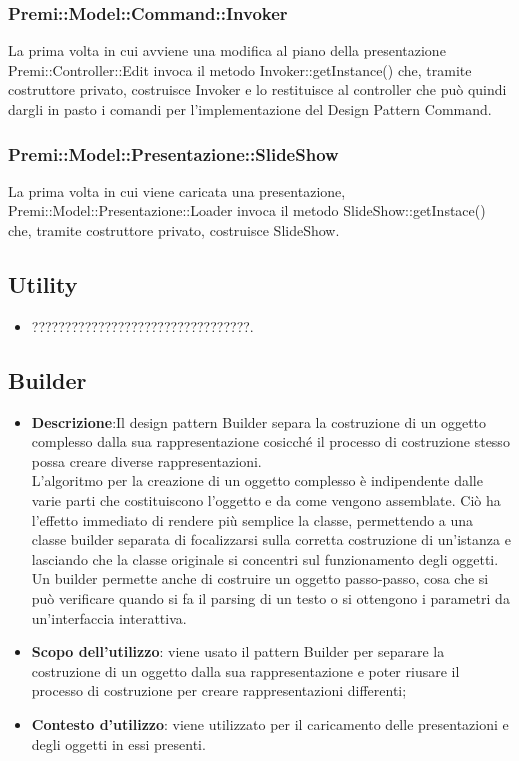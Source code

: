 {{\begin{itemize}
			\subsubsection{Premi::Model::Command::Invoker}{
				La prima volta in cui avviene una modifica al piano della presentazione Premi::Controller::Edit invoca il metodo Invoker::getInstance() che, tramite costruttore privato, costruisce Invoker e lo restituisce al controller che può quindi dargli in pasto i comandi per l'implementazione del Design Pattern Command.\\  
			}
			\subsubsection{Premi::Model::Presentazione::SlideShow}{
							La prima volta in cui viene caricata una presentazione, Premi::Model::Presentazione::Loader invoca il metodo SlideShow::getInstace() che, tramite costruttore privato, costruisce SlideShow.\\  
						}
		\end{itemize}
	}
	\subsection{Utility}{
		\begin{itemize}
			\item ?????????????????????????????????.
		\end{itemize}
	}
	\subsection{Builder}{
		\begin{itemize}
			\item \textbf{Descrizione}:Il design pattern Builder separa la costruzione di un oggetto complesso dalla sua rappresentazione cosicché il processo di costruzione stesso possa creare diverse rappresentazioni.\\			
			L'algoritmo per la creazione di un oggetto complesso è indipendente dalle varie parti che costituiscono l'oggetto e da come vengono assemblate.	Ciò ha l'effetto immediato di rendere più semplice la classe, permettendo a una classe builder separata di focalizzarsi sulla corretta costruzione di un'istanza e lasciando che la classe originale si concentri sul funzionamento degli oggetti. Un builder permette anche di costruire un oggetto passo-passo, cosa che si può verificare quando si fa il parsing di un testo o si ottengono i parametri da un'interfaccia interattiva.
			\item \textbf{Scopo dell’utilizzo}: viene usato il pattern Builder per separare la costruzione di un oggetto dalla sua rappresentazione e poter riusare il processo di costruzione per creare rappresentazioni differenti;
			\item \textbf{Contesto d’utilizzo}: viene utilizzato per il caricamento delle presentazioni e degli oggetti in essi presenti.
		\end{itemize}
}}
